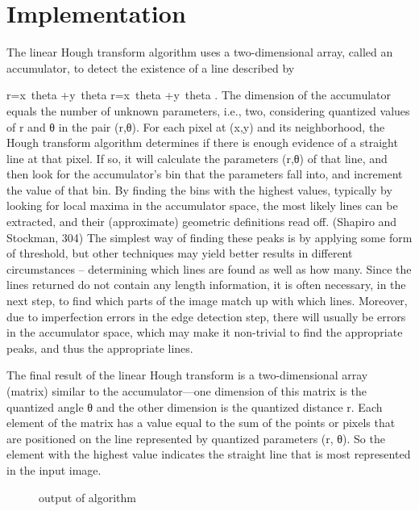 \documentclass[12pt]{report}	%
\newcommand{\squeezeup}{\vspace{-0.6cm}}
\begin{document}
\section{Implementation}
The linear Hough transform algorithm uses a two-dimensional array, called an accumulator, to detect the existence of a line described by 

{\displaystyle r=x\cos \ theta +y\sin \ theta }r=x\cos \ theta +y\sin \ theta . The dimension of the accumulator equals the number of unknown parameters, i.e., two, considering quantized values of r and θ in the pair (r,θ). For each pixel at (x,y) and its neighborhood, the Hough transform algorithm determines if there is enough evidence of a straight line at that pixel. If so, it will calculate the parameters (r,θ) of that line, and then look for the accumulator's bin that the parameters fall into, and increment the value of that bin. By finding the bins with the highest values, typically by looking for local maxima in the accumulator space, the most likely lines can be extracted, and their (approximate) geometric definitions read off. (Shapiro and Stockman, 304) The simplest way of finding these peaks is by applying some form of threshold, but other techniques may yield better results in different circumstances – determining which lines are found as well as how many. Since the lines returned do not contain any length information, it is often necessary, in the next step, to find which parts of the image match up with which lines. Moreover, due to imperfection errors in the edge detection step, there will usually be errors in the accumulator space, which may make it non-trivial to find the appropriate peaks, and thus the appropriate lines.

The final result of the linear Hough transform is a two-dimensional array (matrix) similar to the accumulator—one dimension of this matrix is the quantized angle θ and the other dimension is the quantized distance r. Each element of the matrix has a value equal to the sum of the points or pixels that are positioned on the line represented by quantized parameters (r, θ). So the element with the highest value indicates the straight line that is most represented in the input image.


\begin{figure}[!h]
	\captionsetup{font=scriptsize}
	\begin{center}
		\centerline{}
		\caption{output of algorithm}
		\label{fig:1}
	\end{center}
	\squeezeup
\end{figure}
\end{document}
